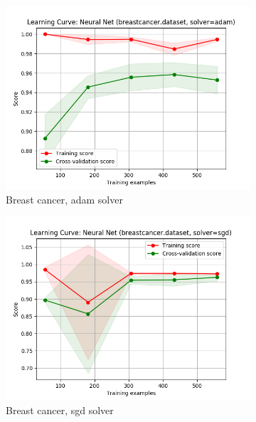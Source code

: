 \documentclass{article}
\begin{document}
\begin{figure}[htb]
    \begin{subfigure}{0.33\textwidth}
      \includegraphics[width=\linewidth]{out/neural_net/breastcancer-solver-adam.png}
      \caption{Breast cancer, adam solver}
      \label{fig:nn-param-4}
    \end{subfigure}\hfil
    \begin{subfigure}{0.33\textwidth}
      \includegraphics[width=\linewidth]{out/neural_net/breastcancer-solver-sgd.png}
      \caption{Breast cancer, sgd solver}
      \label{fig:nn-param-5}
    \end{subfigure}\hfil
    \begin{subfigure}{0.33\textwidth}

\end{subfigure}
\end{figure}
\end{document}
